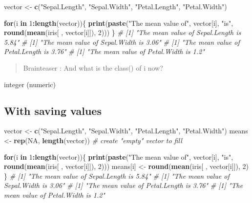 \documentclass[
]{book}
\newenvironment{Shaded}{\begin{snugshade}}{\end{snugshade}}
\newcommand{\CommentTok}[1]{\textcolor[rgb]{0.56,0.35,0.01}{\textit{#1}}}
\newcommand{\ConstantTok}[1]{\textcolor[rgb]{0.56,0.35,0.01}{#1}}
\newcommand{\ControlFlowTok}[1]{\textcolor[rgb]{0.13,0.29,0.53}{\textbf{#1}}}
\newcommand{\DecValTok}[1]{\textcolor[rgb]{0.00,0.00,0.81}{#1}}
\newcommand{\FunctionTok}[1]{\textcolor[rgb]{0.13,0.29,0.53}{\textbf{#1}}}
\newcommand{\NormalTok}[1]{#1}
\newcommand{\OtherTok}[1]{\textcolor[rgb]{0.56,0.35,0.01}{#1}}
\newcommand{\SpecialCharTok}[1]{\textcolor[rgb]{0.81,0.36,0.00}{\textbf{#1}}}
\newcommand{\StringTok}[1]{\textcolor[rgb]{0.31,0.60,0.02}{#1}}
\begin{document}
\begin{Shaded}
\begin{Highlighting}[]
\NormalTok{vector }\OtherTok{\textless{}{-}} \FunctionTok{c}\NormalTok{(}\StringTok{"Sepal.Length"}\NormalTok{, }\StringTok{"Sepal.Width"}\NormalTok{, }\StringTok{"Petal.Length"}\NormalTok{, }\StringTok{"Petal.Width"}\NormalTok{)}

\ControlFlowTok{for}\NormalTok{(i }\ControlFlowTok{in} \DecValTok{1}\SpecialCharTok{:}\FunctionTok{length}\NormalTok{(vector))\{}
  \FunctionTok{print}\NormalTok{(}\FunctionTok{paste}\NormalTok{(}\StringTok{"The mean value of"}\NormalTok{, vector[i], }\StringTok{"is"}\NormalTok{, }
              \FunctionTok{round}\NormalTok{(}\FunctionTok{mean}\NormalTok{(iris[ , vector[i]]), }\DecValTok{2}\NormalTok{)))}
\NormalTok{\}}
\CommentTok{\# [1] "The mean value of Sepal.Length is 5.84"}
\CommentTok{\# [1] "The mean value of Sepal.Width is 3.06"}
\CommentTok{\# [1] "The mean value of Petal.Length is 3.76"}
\CommentTok{\# [1] "The mean value of Petal.Width is 1.2"}
\end{Highlighting}
\end{Shaded}

\begin{quote}
Brainteaser :
And what is the class() of i now?
\end{quote}

integer (numeric)

\subsection{With saving values}\label{with-saving-values}

\begin{Shaded}
\begin{Highlighting}[]
\NormalTok{vector }\OtherTok{\textless{}{-}} \FunctionTok{c}\NormalTok{(}\StringTok{"Sepal.Length"}\NormalTok{, }\StringTok{"Sepal.Width"}\NormalTok{, }\StringTok{"Petal.Length"}\NormalTok{, }\StringTok{"Petal.Width"}\NormalTok{)}
\NormalTok{means }\OtherTok{\textless{}{-}} \FunctionTok{rep}\NormalTok{(}\ConstantTok{NA}\NormalTok{, }\FunctionTok{length}\NormalTok{(vector)) }\CommentTok{\# create "empty" vector to fill}

\ControlFlowTok{for}\NormalTok{(i }\ControlFlowTok{in} \DecValTok{1}\SpecialCharTok{:}\FunctionTok{length}\NormalTok{(vector))\{}
  \FunctionTok{print}\NormalTok{(}\FunctionTok{paste}\NormalTok{(}\StringTok{"The mean value of"}\NormalTok{, vector[i], }\StringTok{"is"}\NormalTok{, }
              \FunctionTok{round}\NormalTok{(}\FunctionTok{mean}\NormalTok{(iris[ , vector[i]]), }\DecValTok{2}\NormalTok{)))}
\NormalTok{  means[i] }\OtherTok{\textless{}{-}} \FunctionTok{round}\NormalTok{(}\FunctionTok{mean}\NormalTok{(iris[ , vector[i]]), }\DecValTok{2}\NormalTok{)}
\NormalTok{\}}
\CommentTok{\# [1] "The mean value of Sepal.Length is 5.84"}
\CommentTok{\# [1] "The mean value of Sepal.Width is 3.06"}
\CommentTok{\# [1] "The mean value of Petal.Length is 3.76"}
\CommentTok{\# [1] "The mean value of Petal.Width is 1.2"}
\end{Highlighting}
\end{Shaded}
\end{document}
